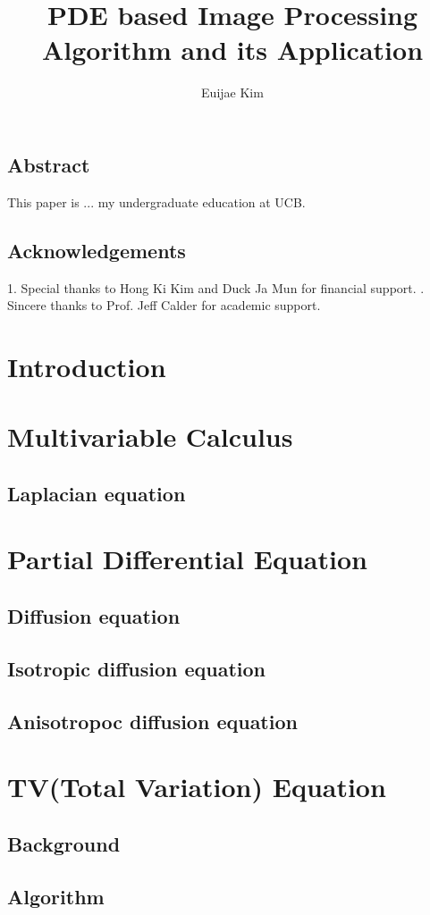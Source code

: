 \documentclass[10pt, openright]{report}
\title{PDE based Image Processing Algorithm and its Application}
\author{Euijae Kim}
\begin{document}
	\maketitle
	\section*{Abstract}
		This paper is ... my undergraduate education at UCB. 
	\section*{Acknowledgements}
		1. Special thanks to Hong Ki Kim and Duck Ja Mun 
		for financial support. . Sincere thanks to Prof. Jeff Calder for academic 
		support.
	
	\tableofcontents
		\chapter{Introduction}
		\chapter{Multivariable Calculus}	
			\section{Laplacian equation}	
		\chapter{Partial Differential Equation}
			\section{Diffusion equation}
			\section{Isotropic diffusion equation}
			\section{Anisotropoc diffusion equation}
		\chapter{TV(Total Variation) Equation}
			\section{Background}
			\section{Algorithm}
\end{document}

